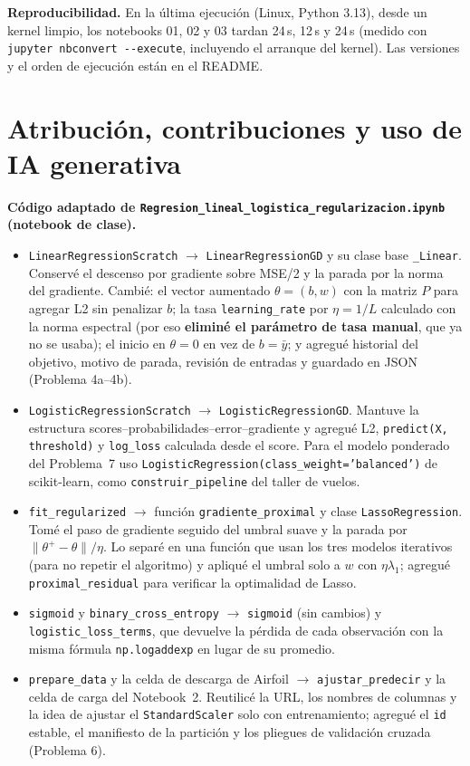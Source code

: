 \documentclass[10pt,a4paper]{article}
\newcommand{\tiempoUno}{24\,s}
\newcommand{\tiempoDos}{12\,s}
\newcommand{\tiempoTres}{24\,s}
\newcommand{\equipo}{Linux, Python 3.13}
\begin{document}
\textbf{Reproducibilidad.} En la última ejecución (\equipo), desde un kernel limpio, los notebooks 01, 02 y 03 tardan \tiempoUno, \tiempoDos{} y \tiempoTres{} (medido con \texttt{jupyter nbconvert -{}-execute}, incluyendo el arranque del kernel). Las versiones y el orden de ejecución están en el README.


\section*{Atribución, contribuciones y uso de IA generativa}
\textbf{Código adaptado de \texttt{Regresion\_lineal\_logistica\_regularizacion.ipynb} (notebook de clase).}
\begin{itemize}
\item \texttt{LinearRegressionScratch} $\to$ \texttt{LinearRegressionGD} y su clase base \texttt{\_Linear}. Conservé el descenso por gradiente sobre MSE/2 y la parada por la norma del gradiente. Cambié: el vector aumentado $\theta=(b,w)$ con la matriz $P$ para agregar L2 sin penalizar $b$; la tasa \texttt{learning\_rate} por $\eta=1/L$ calculado con la norma espectral (por eso \textbf{eliminé el parámetro de tasa manual}, que ya no se usaba); el inicio en $\theta=0$ en vez de $b=\bar y$; y agregué historial del objetivo, motivo de parada, revisión de entradas y guardado en JSON (Problema 4a--4b).
\item \texttt{LogisticRegressionScratch} $\to$ \texttt{LogisticRegressionGD}. Mantuve la estructura scores--probabilidades--error--gradiente y agregué L2, \texttt{predict(X, threshold)} y \texttt{log\_loss} calculada desde el score. Para el modelo ponderado del Problema~7 uso \texttt{LogisticRegression(class\_weight='balanced')} de scikit-learn, como \texttt{construir\_pipeline} del taller de vuelos.
\item \texttt{fit\_regularized} $\to$ función \texttt{gradiente\_proximal} y clase \texttt{LassoRegression}. Tomé el paso de gradiente seguido del umbral suave y la parada por $\lVert\theta^+-\theta\rVert/\eta$. Lo separé en una función que usan los tres modelos iterativos (para no repetir el algoritmo) y apliqué el umbral solo a $w$ con $\eta\lambda_1$; agregué \texttt{proximal\_residual} para verificar la optimalidad de Lasso.
\item \texttt{sigmoid} y \texttt{binary\_cross\_entropy} $\to$ \texttt{sigmoid} (sin cambios) y \texttt{logistic\_loss\_terms}, que devuelve la pérdida de cada observación con la misma fórmula \texttt{np.logaddexp} en lugar de su promedio.
\item \texttt{prepare\_data} y la celda de descarga de Airfoil $\to$ \texttt{ajustar\_predecir} y la celda de carga del Notebook~2. Reutilicé la URL, los nombres de columnas y la idea de ajustar el \texttt{StandardScaler} solo con entrenamiento; agregué el \texttt{id} estable, el manifiesto de la partición y los pliegues de validación cruzada (Problema 6).
\end{itemize}
\end{document}

